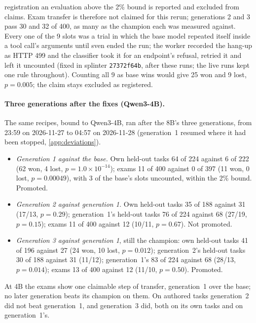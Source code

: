 registration an evaluation above the 2\% bound is reported and excluded from claims. Exam transfer is therefore not claimed for
this rerun; generations 2 and 3 pass 30 and 32 of 400, as many as the champion each was measured against. Every one of the 9 slots was a
trial in which the base model repeated itself inside a tool call's arguments until sven ended the run; the worker recorded the
hang-up as HTTP 499 and the classifier took it for an endpoint's refusal, retried it and left it uncounted (fixed in splinter
\texttt{27372f64b}, after these runs; the live runs kept one rule throughout). Counting all 9 as base wins would give 25 won and
9 lost, $p=0.005$; the claim stays excluded as registered.

\paragraph{Three generations after the fixes (Qwen3-4B).} The same recipes, bound to Qwen3-4B, ran after the 8B's three
generations, from 23:59 on 2026-11-27 to 04:57 on 2026-11-28 (generation~1 resumed where it had been stopped,
\cref{app:deviations}).
\begin{itemize}
\item \emph{Generation 1 against the base.} Own held-out tasks 64 of 224 against 6 of 222 (62 won, 4 lost,
  $p=1.0\times10^{-14}$); exams 11 of 400 against 0 of 397 (11 won, 0 lost, $p=0.00049$), with 3 of the base's slots
  uncounted, within the 2\% bound. Promoted.
\item \emph{Generation 2 against generation 1.} Own held-out tasks 35 of 188 against 31 (17/13, $p=0.29$); generation~1's
  held-out tasks 76 of 224 against 68 (27/19, $p=0.15$); exams 11 of 400 against 12 (10/11, $p=0.67$). Not promoted.
\item \emph{Generation 3 against generation 1}, still the champion: own held-out tasks 41 of 196 against 27 (24 won, 10 lost,
  $p=0.012$); generation~2's held-out tasks 30 of 188 against 31 (11/12); generation~1's 83 of 224 against 68 (28/13,
  $p=0.014$); exams 13 of 400 against 12 (11/10, $p=0.50$). Promoted.
\end{itemize}
At 4B the exams show one claimable step of transfer, generation~1 over the base; no later generation beats its champion on
them. On authored tasks generation~2 did not beat generation~1, and generation~3 did, both on its own tasks and on
generation~1's.

